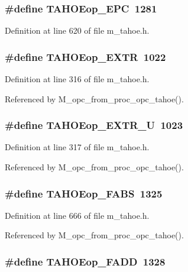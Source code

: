 \subsubsection{\setlength{\rightskip}{0pt plus 5cm}\#define TAHOEop\_\-EPC~1281}\label{m__tahoe_8h_8b90af0ddd70ed1bbe95b08934965e4d}




Definition at line 620 of file m\_\-tahoe.h.
\subsubsection{\setlength{\rightskip}{0pt plus 5cm}\#define TAHOEop\_\-EXTR~1022}\label{m__tahoe_8h_e40ac8ed261a942d6dfed93f2ac845f9}




Definition at line 316 of file m\_\-tahoe.h.

Referenced by M\_\-opc\_\-from\_\-proc\_\-opc\_\-tahoe().
\subsubsection{\setlength{\rightskip}{0pt plus 5cm}\#define TAHOEop\_\-EXTR\_\-U~1023}\label{m__tahoe_8h_b9b7c2b126b87137cfe4f31d590448ce}




Definition at line 317 of file m\_\-tahoe.h.

Referenced by M\_\-opc\_\-from\_\-proc\_\-opc\_\-tahoe().
\subsubsection{\setlength{\rightskip}{0pt plus 5cm}\#define TAHOEop\_\-FABS~1325}\label{m__tahoe_8h_19cb33bad44ed610ea26e984229a6bb4}




Definition at line 666 of file m\_\-tahoe.h.

Referenced by M\_\-opc\_\-from\_\-proc\_\-opc\_\-tahoe().
\subsubsection{\setlength{\rightskip}{0pt plus 5cm}\#define TAHOEop\_\-FADD~1328}\label{m__tahoe_8h_0ae69b0db6f33620b8856e5816c12d68}




